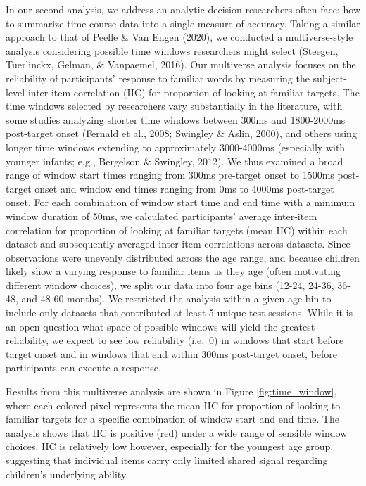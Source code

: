 \documentclass[10pt, letterpaper]{article}
\begin{document}
In our second analysis, we address an analytic decision researchers
often face: how to summarize time course data into a single measure of
accuracy. Taking a similar approach to that of Peelle \& Van Engen
(2020), we conducted a multiverse-style analysis considering possible
time windows researchers might select (Steegen, Tuerlinckx, Gelman, \&
Vanpaemel, 2016). Our multiverse analysis focuses on the reliability of
participants' response to familiar words by measuring the subject-level
inter-item correlation (IIC) for proportion of looking at familiar
targets. The time windows selected by researchers vary substantially in
the literature, with some studies analyzing shorter time windows between
300ms and 1800-2000ms post-target onset (Fernald et al., 2008; Swingley
\& Aslin, 2000), and others using longer time windows extending to
approximately 3000-4000ms (especially with younger infants; e.g.,
Bergelson \& Swingley, 2012). We thus examined a broad range of window
start times ranging from 300ms pre-target onset to 1500ms post-target
onset and window end times ranging from 0ms to 4000ms post-target onset.
For each combination of window start time and end time with a minimum
window duration of 50ms, we calculated participants' average inter-item
correlation for proportion of looking at familiar targets (mean IIC)
within each dataset and subsequently averaged inter-item correlations
across datasets. Since observations were unevenly distributed across the
age range, and because children likely show a varying response to
familiar items as they age (often motivating different window choices),
we split our data into four age bins (12-24, 24-36, 36-48, and 48-60
months). We restricted the analysis within a given age bin to include
only datasets that contributed at least 5 unique test sessions. While it
is an open question what space of possible windows will yield the
greatest reliability, we expect to see low reliability (i.e.~0) in
windows that start before target onset and in windows that end within
300ms post-target onset, before participants can execute a response.

Results from this multiverse analysis are shown in Figure
\ref{fig:time_window}, where each colored pixel represents the mean IIC
for proportion of looking to familiar targets for a specific combination
of window start and end time. The analysis shows that IIC is positive
(red) under a wide range of sensible window choices. IIC is relatively
low however, especially for the youngest age group, suggesting that
individual items carry only limited shared signal regarding children's
underlying ability.
\end{document}

